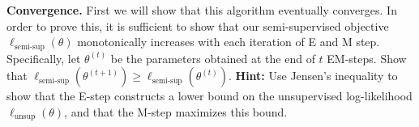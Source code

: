 \item{}
\textbf{Convergence.}
First we will show that this algorithm eventually converges. In order to prove this, it is sufficient to show that our semi-supervised objective $\ell_\text{semi-sup}(\theta)$ monotonically increases with each iteration of E and M step. Specifically, let $\theta^{(t)}$ be the parameters obtained at the end of $t$ EM-steps. Show that $\ell_\text{semi-sup}(\theta^{(t+1)}) \ge \ell_\text{semi-sup}(\theta^{(t)})$. \textbf{Hint:} Use Jensen's inequality to show that the E-step constructs a lower bound on the 
unsupervised log-likelihood $\ell_{\text{unsup}}(\theta)$, and that the M-step maximizes this bound. 

